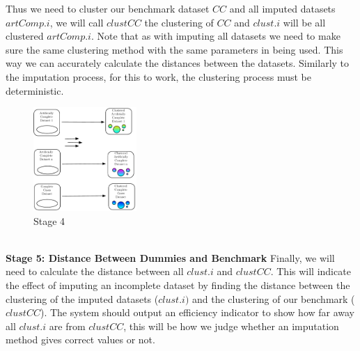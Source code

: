 \documentclass{IEEEconf}
\begin{document}
		Thus we need to cluster our benchmark dataset $CC$ and all imputed datasets $artComp.i$, we will call $clustCC$ the clustering of $CC$ and $clust.i$ will be all clustered $artComp.i$. Note that as with imputing all datasets we need to make sure the same clustering method with the same parameters in being used. This way we can accurately calculate the distances between the datasets. Similarly to the imputation process, for this to work, the clustering process must be deterministic.
		\begin{figure}[!ht]
			\caption{Stage 4}
			\centering
			\includegraphics[width=0.35\textwidth]{stage4-2.pdf}
		\end{figure}
		\\
		\indent \textbf{Stage 5: Distance Between Dummies and Benchmark}
		Finally, we will need to calculate the distance between all $clust.i$ and $clustCC$. This will indicate the effect of imputing an incomplete dataset by finding the distance between the clustering of the imputed datasets ($clust.i)$ and the clustering of our benchmark ($clustCC$). The system should output an efficiency indicator to show how far away all $clust.i$ are from $clustCC$, this will be how we judge whether an imputation method gives correct values or not. 
\end{document}

